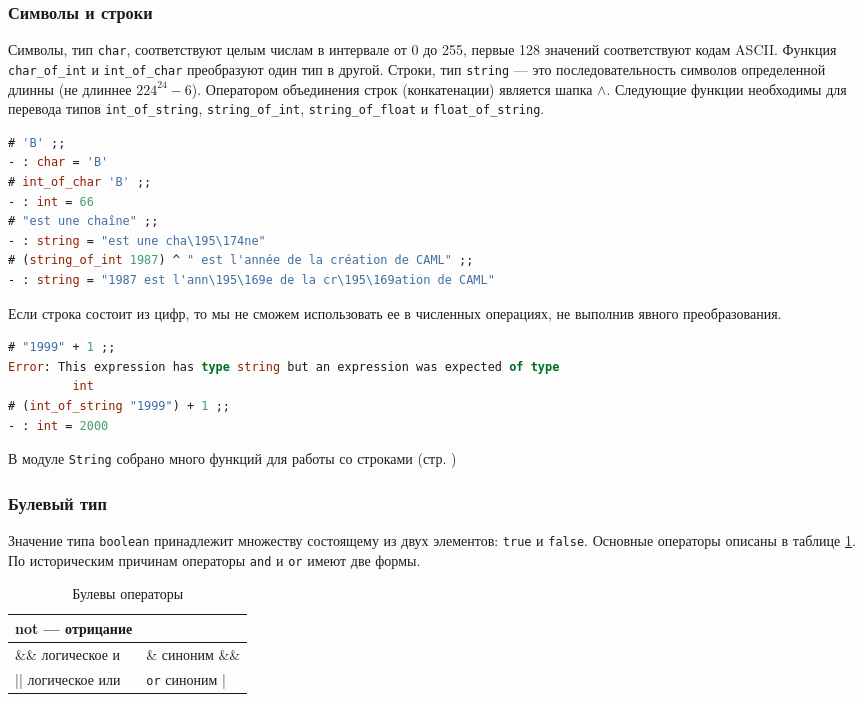 \subsubsection{Символы и строки}

Символы, тип \texttt{char}, соответствуют целым числам в интервале от 0 до 255,
первые 128 значений соответствуют кодам ASCII. Функция \texttt{char\_of\_int} и
\texttt{int\_of\_char} преобразуют один тип в другой. Строки, тип
\texttt{string} --- это последовательность символов определенной длинны (не
длиннее $224^{24} - 6$). Оператором объединения строк (конкатенации) является
шапка $\wedge$. Следующие функции необходимы для перевода типов
\texttt{int\_of\_string}, \texttt{string\_of\_int}, \texttt{string\_of\_float} и
\texttt{float\_of\_string}.

\begin{lstlisting}[language=OCaml]
# 'B' ;;
- : char = 'B'
# int_of_char 'B' ;;
- : int = 66
# "est une chaîne" ;;
- : string = "est une cha\195\174ne"
# (string_of_int 1987) ^ " est l'année de la création de CAML" ;;
- : string = "1987 est l'ann\195\169e de la cr\195\169ation de CAML"
\end{lstlisting}

Если строка состоит из цифр, то мы не сможем использовать ее в численных
операциях, не выполнив явного преобразования.

\begin{lstlisting}[language=OCaml]
# "1999" + 1 ;;
Error: This expression has type string but an expression was expected of type
         int
# (int_of_string "1999") + 1 ;;
- : int = 2000
\end{lstlisting}

В модуле \texttt{String} собрано много функций для работы со строками (стр.
\pageref{??})

\subsubsection{Булевый тип}

Значение типа \texttt{boolean} принадлежит множеству состоящему из двух
элементов: \texttt{true} и \texttt{false}. Основные операторы описаны в таблице
\ref{tbl:boolean_operations}. По историческим причинам операторы \texttt{and} и
\texttt{or} имеют две формы.

\begin{table}[hl]
\begin{center}
	\caption{Булевы операторы}
	\begin{tabular}{|p{5cm}|p{5cm}|}
	\hline
	not --- отрицание & \\
	\hline
	\&\& логическое и & \& синоним \&\& \\
	\hline
	|| логическое или & \texttt{or} синоним | \\
	\hline
	\end{tabular}
\end{center}
	\label{tbl:boolean_operations}
\end{table}

